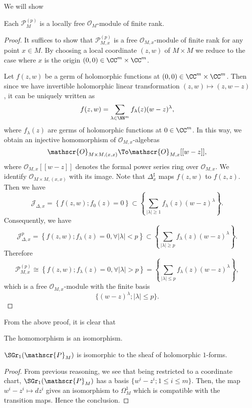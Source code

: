 We will show
\begin{theorem}
Each $\mathscr{P}_M^{(p)}$ is a locally free $\mathscr{O}_M$-module 
of finite rank.
\end{theorem}
\begin{proof}
It suffices to show that $\mathscr{P}_{M,x}^{(p)}$ is a free 
$\mathscr{O}_{M,x}$-module of finite rank for any point $x\in M$.
By choosing a local coordinate $(z,w)$ of $M\times M$ 
we reduce to the case where $x$ is the origin $(0,0)\in\CC^m\times\CC^m$.

Let $f(z,w)$ be a germ of holomorphic functions at $(0,0)\in\CC^m\times\CC^m$. 
Then since we have invertible holomorphic linear transformation 
$(z,w)\mapsto(z,w-z)$, it can be uniquely written as 
\[
f(z,w)=\sum_{\lambda\in\NN^m}f_\lambda(z)(w-z)^\lambda,
\]
where $f_\lambda(z)$ are germs of holomorphic functions at $0\in\CC^m$. 
In this way, we obtain an injective homomorphism of $\mathscr{O}_{M,x}$-algebras
\[
\mathscr{O}_{M\times M,(x,x)}\To\mathscr{O}_{M,x}[[w-z]],
\]
where $\mathscr{O}_{M,x}[[w-z]]$ denotes the formal power series ring over $\mathscr{O}_{M,x}$. 
We identify $\mathscr{O}_{M\times M,(x,x)}$ with its image. 
Note that $\Delta^\sharp_x$ maps $f(z,w)$ to $f(z,z)$. Then we have
\[
\mathscr{J}_{\Delta,x}=\left\{f(z,w);f_0(z)=0\right\}\subset
\left\{\sum_{|\lambda|\ge1}f_\lambda(z)(w-z)^\lambda\right\}.
\]
Consequently, we have
\[
\mathscr{J}_{\Delta,x}^p=
\left\{f(z,w);f_\lambda(z)=0,\forall|\lambda|<p\right\}\subset
\left\{\sum_{|\lambda|\ge p}f_\lambda(z)(w-z)^\lambda\right\}.
\]
Therefore 
\[
\mathscr{P}_{M,x}^{(p)}\cong
\left\{f(z,w);f_\lambda(z)=0,\forall|\lambda|> p\right\}=
\left\{\sum_{|\lambda|\le p}f_\lambda(z)(w-z)^\lambda\right\},
\]
which is a free $\mathscr{O}_{M,x}$-module 
with the finite basis
\[
\{(w-z)^\lambda;|\lambda|\le p\}.
\]
\end{proof}

From the above proof, it is clear that
\begin{cor}
The homomorphism  is an isomorphism.
\end{cor}

\begin{cor}
$\SGr_1(\mathscr{P}_M)$ is isomorphic to 
the sheaf of holomorphic $1$-forms.
\end{cor}
\begin{proof}
From previous reasoning, we see that being restricted to a coordinate chart, 
$\SGr_1(\mathscr{P}_M)$ has a basis $\{w^i-z^i;1\le i\le m\}$. 
Then, the map $w^i-z^i\mapsto dz^i$ gives an isomorphism to $\Omega_{M}^1$ 
which is compatible with the transition maps. Hence the conclusion.
\end{proof}

